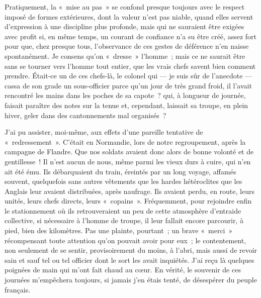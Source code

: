 \documentclass[french,twoside]{book} %
\begin{document}
Pratiquement, la « mise au pas » se confond   presque toujours avec le respect imposé de formes extérieures, dont la valeur n’est pas niable, quand elles servent d’expression à une discipline plus profonde, mais qui ne sauraient être exigées avec profit si, en même temps, un courant de confiance n’a su être créé, assez fort pour que, chez presque tous, l’observance de ces gestes de déférence n’en naisse spontanément. Je consens qu’on « dresse » l’homme ; mais ce ne saurait être sans se tourner vers l’homme tout entier, que les vrais chefs savent bien comment prendre. Était-ce un de ces chefs-là, le colonel qui — je suis sûr de l’anecdote — cassa de son grade un sous-officier parce qu’un jour de très grand froid, il l’avait rencontré les mains dans les poches de sa capote ? qui, à longueur de journée, faisait paraître des notes sur la tenue et, cependant, laissait sa troupe, en plein hiver, geler dans des cantonnements mal organisés ?\par
J’ai pu assister, moi-même, aux effets d’une pareille tentative de « redressement ». C’était en Normandie, lors de notre regroupement, après la campagne de Flandre. Que nos soldats avaient donc alors de bonne volonté et de gentillesse ! Il n’est aucun de nous, même parmi les vieux durs à cuire, qui n’en ait été ému. Ils débarquaient du train, éreintés par un long voyage, affamés souvent, quelquefois sans autres vêtements que les hardes hétéroclites que les Anglais leur avaient distribuées, après naufrage. Ils avaient perdu, en route, leurs unités, leurs chefs directs, leurs « copains ». Fréquemment, pour rejoindre enfin le stationnement où ils retrouveraient un peu de cette atmosphère d’entraide collective, si nécessaire à l’homme de troupe, il leur fallait encore parcourir, à pied, bien des kilomètres. Pas une plainte, pourtant ; un brave « merci » récompensant toute attention qu’on pouvait avoir pour eux ; le contentement, non seulement de se sentir, provisoirement du moins, à l’abri, mais aussi de revoir sain et sauf tel ou tel officier dont   le sort les avait inquiétés. J’ai reçu là quelques poignées de main qui m’ont fait chaud au cœur. En vérité, le souvenir de ces journées m’empêchera toujours, si jamais j’en étais tenté, de désespérer du peuple français.\par
\end{document}
